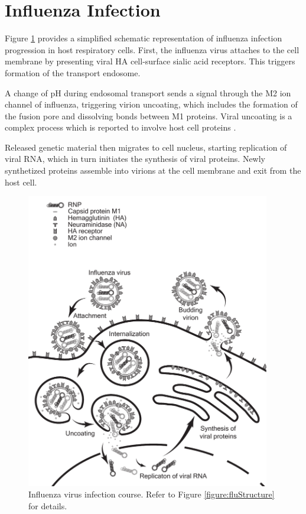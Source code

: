 \section{Influenza Infection}

Figure \ref{figure:fluInfectionStages} provides a simplified schematic representation of influenza infection progression in host respiratory cells. First, the influenza virus attaches to the cell membrane by presenting viral HA cell-surface sialic acid receptors. This triggers formation of the transport endosome.

A change of pH during endosomal transport sends a signal through the M2 ion channel of influenza, triggering virion uncoating, which includes the formation of the fusion pore and dissolving bonds between M1 proteins. Viral uncoating is a complex process which is reported to involve host cell proteins \cite{banerjee2014influenza}.

Released genetic material then migrates to cell nucleus, starting replication of viral RNA, which in turn initiates the synthesis of viral proteins. Newly synthetized proteins assemble into virions at the cell membrane and exit from the host cell.

\begin{figure}
\begin{center}
\includegraphics[width=0.95\textwidth, trim={0cm 0cm 0cm 0cm}, clip]{D_chapters/0_introduction/flu_stages.pdf}
\caption[Influenza virus infection course]{Influenza virus infection course. Refer to Figure \ref{figure:fluStructure} for details.}
\label{figure:fluInfectionStages}
\end{center}
\end{figure}